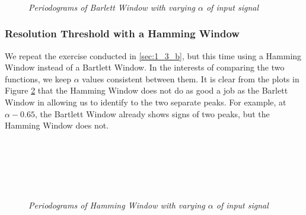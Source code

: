 \documentclass[./main.tex]{subfiles}
\begin{document}
\begin{figure}[h]
	\centering
	\begin{subfigure}[b]{0.23\textwidth}
		\resizebox{\textwidth}{!}{}
	\end{subfigure}
	~ %
	\begin{subfigure}[b]{0.23\textwidth}
		\resizebox{\textwidth}{!}{}
	\end{subfigure}
	~ %
	\begin{subfigure}[b]{0.23\textwidth}
		\resizebox{\textwidth}{!}{}
	\end{subfigure}
	~ %
	\begin{subfigure}[b]{0.23\textwidth}
		\resizebox{\textwidth}{!}{}
	\end{subfigure}
	\label{fig:1_3_b}
	\caption{\textit{Periodograms of Barlett Window with varying $ \alpha $ of input signal}}
\end{figure}

\subsubsection{Resolution Threshold with a Hamming Window}
We repeat the exercise conducted in \ref{sec:1_3_b}, but this time using a Hamming Window instead of a Bartlett Window. In the interests of comparing the two functions, we keep $ \alpha $ values consistent between them. It is clear from the plots in Figure \ref{fig:1_3_c} that the Hamming Window does not do as good a job as the Barlett Window in allowing us to identify to the two separate peaks. For example, at $ \alpha - 0.65$, the Bartlett Window already shows signs of two peaks, but the Hamming Window does not.

\begin{figure}[h]
	\centering
	\begin{subfigure}[b]{0.23\textwidth}
		\resizebox{\textwidth}{!}{}
	\end{subfigure}
	~ %
	\begin{subfigure}[b]{0.23\textwidth}
		\resizebox{\textwidth}{!}{}
	\end{subfigure}
	~ %
	\begin{subfigure}[b]{0.23\textwidth}
		\resizebox{\textwidth}{!}{}
	\end{subfigure}
	~ %
	\begin{subfigure}[b]{0.23\textwidth}
		\resizebox{\textwidth}{!}{}
	\end{subfigure}
	\label{fig:1_3_c}
	\caption{\textit{Periodograms of Hamming Window with varying $ \alpha $ of input signal}}
\end{figure}
\end{document}
